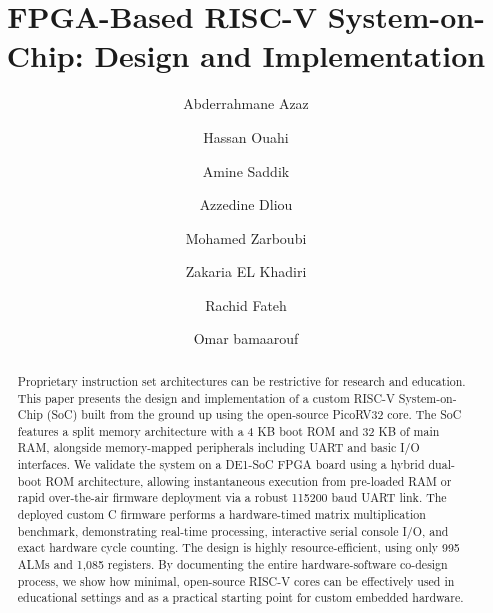 \documentclass[runningheads]{llncs}
\begin{document}
\raggedbottom
%
\title{FPGA-Based RISC-V System-on-Chip: Design
and Implementation}
%
%
\author{Abderrahmane Azaz \and
Hassan Ouahi\and
Amine Saddik \and
Azzedine Dliou \and
Mohamed Zarboubi \and
Zakaria EL Khadiri \and Rachid Fateh \and Omar bamaarouf 
}
%
\authorrunning{   }
%
%
\maketitle              %
%
\begin{abstract}
Proprietary instruction set architectures can be restrictive for research and education. This paper presents the design and implementation of a custom RISC-V System-on-Chip (SoC) built from the ground up using the open-source PicoRV32 core. The SoC features a split memory architecture with a 4 KB boot ROM and 32 KB of main RAM, alongside memory-mapped peripherals including UART and basic I/O interfaces. We validate the system on a DE1-SoC FPGA board using a hybrid dual-boot ROM architecture, allowing instantaneous execution from pre-loaded RAM or rapid over-the-air firmware deployment via a robust 115200 baud UART link. The deployed custom C firmware performs a hardware-timed matrix multiplication benchmark, demonstrating real-time processing, interactive serial console I/O, and exact hardware cycle counting. The design is highly resource-efficient, using only 995 ALMs and 1,085 registers. By documenting the entire hardware-software co-design process, we show how minimal, open-source RISC-V cores can be effectively used in educational settings and as a practical starting point for custom embedded hardware.

\end{abstract}
\end{document}
